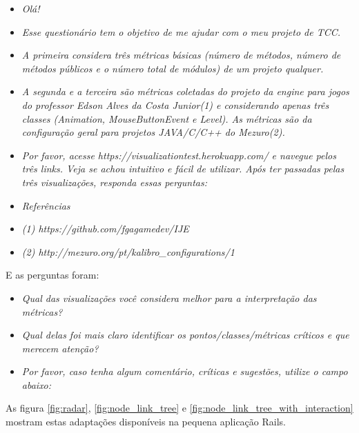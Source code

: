 \begin{itemize}
  \item[] \textit{Olá!}
  \item[] \textit{Esse questionário tem o objetivo de me ajudar com o meu
	projeto de TCC.}
  \item[] \textit{A primeira considera três métricas básicas (número de
	métodos, número de métodos públicos e o número total de módulos) de um
	projeto qualquer.}
  \item[] \textit{A segunda e a terceira são métricas coletadas do projeto da
	engine para jogos do professor Edson Alves da Costa Junior(1) e considerando
	apenas três classes (Animation, MouseButtonEvent e Level). As métricas são da
	configuração geral para projetos JAVA/C/C++ do Mezuro(2).}
	\item[] \textit{Por favor, acesse https://visualizationtest.herokuapp.com/ e
	navegue pelos três links. Veja se achou intuitivo e fácil de utilizar. Após
	ter passadas pelas três visualizações, responda essas perguntas:}
	\item[] \textit{Referências}
	\item[] \textit{(1) https://github.com/fgagamedev/IJE}
	\item[] \textit{(2) http://mezuro.org/pt/kalibro\_configurations/1}
\end{itemize}

E as perguntas foram:

\begin{itemize}
  \item[] \textit{Qual das visualizações você considera melhor para a
	interpretação das métricas?}
  \item[] \textit{Qual delas foi mais claro identificar os
	pontos/classes/métricas críticos e que merecem atenção?}
  \item[] \textit{Por favor, caso tenha algum comentário, críticas e sugestões,
	utilize o campo abaixo:}
\end{itemize}

As figura \ref{fig:radar}, \ref{fig:node_link_tree} e
\ref{fig:node_link_tree_with_interaction} mostram estas adaptações disponíveis
na pequena aplicação Rails.


